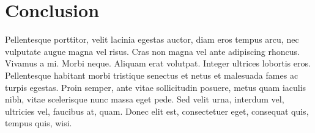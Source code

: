 

\section{Conclusion} %
\label{sec:conclusion}

Pellentesque porttitor, velit lacinia egestas auctor, diam eros tempus arcu,
nec vulputate augue magna vel risus. Cras non magna vel ante adipiscing
rhoncus. Vivamus a mi. Morbi neque. Aliquam erat volutpat. Integer ultrices
lobortis eros. Pellentesque habitant morbi tristique senectus et netus et
malesuada fames ac turpis egestas. Proin semper, ante vitae sollicitudin
posuere, metus quam iaculis nibh, vitae scelerisque nunc massa eget pede. Sed
velit urna, interdum vel, ultricies vel, faucibus at, quam. Donec elit est,
consectetuer eget, consequat quis, tempus quis, wisi.


\nocite{*}
\printbibliography


